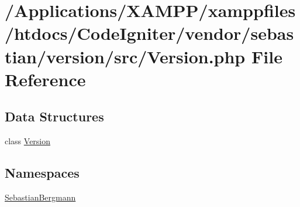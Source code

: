 \hypertarget{sebastian_2version_2src_2_version_8php}{}\section{/\+Applications/\+X\+A\+M\+P\+P/xamppfiles/htdocs/\+Code\+Igniter/vendor/sebastian/version/src/\+Version.php File Reference}
\label{sebastian_2version_2src_2_version_8php}
\subsection*{Data Structures}
\begin{DoxyCompactItemize}
\item 
class \mbox{\hyperlink{class_sebastian_bergmann_1_1_version}{Version}}
\end{DoxyCompactItemize}
\subsection*{Namespaces}
\begin{DoxyCompactItemize}
\item 
 \mbox{\hyperlink{namespace_sebastian_bergmann}{Sebastian\+Bergmann}}
\end{DoxyCompactItemize}
